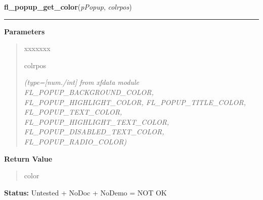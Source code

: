 \hspace{.8\funcindent}\begin{boxedminipage}{\funcwidth}

    \raggedright \textbf{fl\_popup\_get\_color}(\textit{pPopup}, \textit{colrpos})

    \vspace{-1.5ex}

    \rule{\textwidth}{0.5\fboxrule}
\setlength{\parskip}{2ex}
\setlength{\parskip}{1ex}
      \textbf{Parameters}
      \vspace{-1ex}

      \begin{quote}
        \begin{Ventry}{xxxxxxx}

          \item[colrpos]

            {\it (type=[num./int] from xfdata module FL\_POPUP\_BACKGROUND\_COLOR, 
FL\_POPUP\_HIGHLIGHT\_COLOR, FL\_POPUP\_TITLE\_COLOR, 
FL\_POPUP\_TEXT\_COLOR, FL\_POPUP\_HIGHLIGHT\_TEXT\_COLOR, 
FL\_POPUP\_DISABLED\_TEXT\_COLOR, FL\_POPUP\_RADIO\_COLOR)}

        \end{Ventry}

      \end{quote}

      \textbf{Return Value}
    \vspace{-1ex}

      \begin{quote}
      color

      \end{quote}

\textbf{Status:} Untested + NoDoc + NoDemo = NOT OK



    \end{boxedminipage}

    \label{xformslib:flpopup:fl_popup_set_color}

    \vspace{0.5ex}

